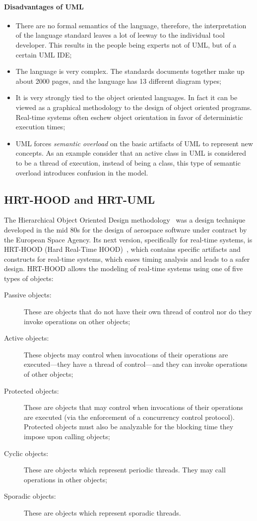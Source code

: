 \paragraph{Disadvantages of UML}
\begin{itemize}
\item{There are no formal semantics of the language, therefore, the
  interpretation of the language standard leaves a lot of leeway to
  the individual tool developer. This results in the people being
  experts not of UML, but of a certain UML IDE;}
\item{The language is very complex. The standards documents together
  make up about 2000 pages, and the language has 13 different diagram
  types;}
\item{It is very strongly tied to the object oriented languages. In
  fact it can be viewed as a graphical methodology to the design of
  object oriented programs. Real-time systems often eschew object
  orientation in favor of deterministic execution times;}
\item{UML forces \emph{semantic overload} on the basic artifacts of
  UML to represent new concepts. As an example consider that an active
  class in UML is considered to be a thread of execution, instead of
  being a class, this type of semantic overload introduces confusion
  in the model.}
\end{itemize}

\subsection{HRT-HOOD and HRT-UML}
The Hierarchical Object Oriented Design
methodology~\cite{vielcanet@wadas89} was a design technique developed
in the mid 80s for the design of aerospace software under contract by
the European Space Agency. Its next version, specifically for
real-time systems, is HRT-HOOD (Hard Real-Time
HOOD)~\cite{burns@rts94}, which contains specific artifacts and
constructs for real-time systems, which eases timing analysis and
leads to a safer design. HRT-HOOD allows the modeling of real-time
systems using one of five types of objects:

\begin{description}
\item[Passive objects:]{These are objects that do not have their own
  thread of control nor do they invoke operations on other objects;}
\item[Active objects:]{These objects may control when invocations of
  their operations are executed---they have a thread of control---and
  they can invoke operations of other objects;}
\item[Protected objects:]{These are objects that may control when
  invocations of their operations are executed (via the enforcement of
  a concurrency control protocol). Protected objects must also be
  analyzable for the blocking time they impose upon calling objects;}
\item[Cyclic objects:]{These are objects which represent periodic
  threads. They may call operations in other objects;}
\item[Sporadic objects:]{These are objects which represent sporadic
  threads.}
\end{description}

